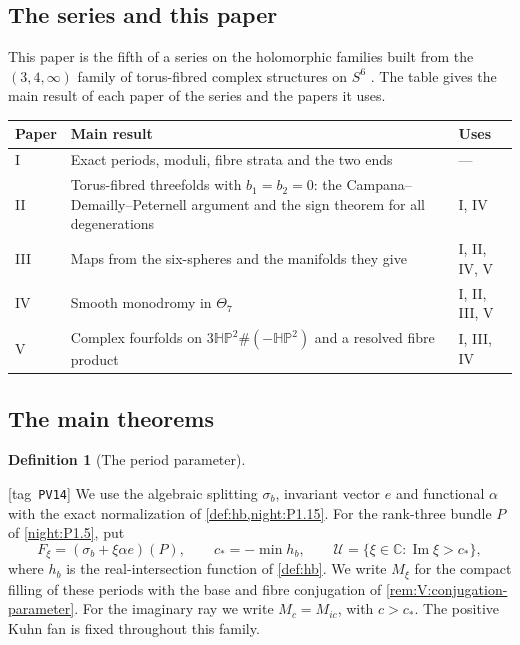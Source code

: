 \documentclass[11pt,a4paper]{article}
\numberwithin{equation}{section}
\theoremstyle{definition}
\newtheorem{definition}[definition]{Definition}
\newcommand{\StatementRecord}[4]{{\upshape\footnotesize[tag~\texttt{#3}]}\enspace\ignorespaces}
\begin{document}
\subsection{The series and this paper}
This paper is the fifth of a series on the holomorphic families built
from the $(3,4,\infty)$ family of torus-fibred complex structures on
$S^6$ \citep{AC26,E26}.  The table gives the main result of each paper
of the series and the papers it uses.
\begin{center}\small
\begin{tabularx}{\textwidth}{@{}lXl@{}}\toprule
Paper & Main result & Uses\\\midrule
I & Exact periods, moduli, fibre strata and the two ends & ---\\
II & Torus-fibred threefolds with $b_1=b_2=0$: the Campana--Demailly--Peternell argument and the sign theorem for all degenerations & I, IV\\
III & Maps from the six-spheres and the manifolds they give & I, II, IV, V\\
IV & Smooth monodromy in $\Theta_7$ & I, II, III, V\\
V & Complex fourfolds on $3\mathbb{HP}^2\#(-\mathbb{HP}^2)$ and a resolved fibre product & I, III, IV\\
\bottomrule\end{tabularx}\end{center}
\subsection{The main theorems}
\hypertarget{tag-03KQ}{}\label{series:V:main-theorems}

\begin{definition}[The period parameter]
\hypertarget{tag-PV14}{}\label{pub:V:parameter}
\StatementRecord{pub:V:parameter}{proved}{PV14}{}
We use the algebraic splitting $\sigma_b$, invariant vector $e$ and
functional $\alpha$ with the exact normalization of
\cref{def:hb,night:P1.15}. For the rank-three bundle $P$ of
\cref{night:P1.5}, put
\[
 F_\xi=(\sigma_b+\xi\alpha e)(P),\qquad
 c_*=-\min h_b,\qquad
 \mathcal U=\{\xi\in\mathbb C:\operatorname{Im}\xi>c_*\},
\]
where $h_b$ is the real-intersection function of \cref{def:hb}.
We write $M_\xi$ for the compact filling of these periods with the
base and fibre conjugation of \cref{rem:V:conjugation-parameter}.
For the imaginary ray we write $M_c=M_{ic}$, with $c>c_*$.
The positive Kuhn fan is fixed throughout this family.
\end{definition}
\end{document}
